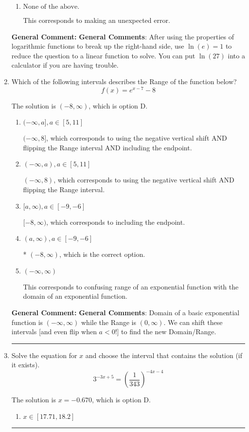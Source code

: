 \documentclass{extbook}[14pt]
\newcommand{\litem}[1]{\item #1

\rule{\textwidth}{0.4pt}}
\begin{document}
\begin{enumerate}
{\begin{enumerate}[label=\Alph*.]
This corresponds to believing you cannot solve the equation.
\item \( \text{None of the above.} \)

This corresponds to making an unexpected error.
\end{enumerate}

\textbf{General Comment:} \textbf{General Comments}: After using the properties of logarithmic functions to break up the right-hand side, use $\ln(e) = 1$ to reduce the question to a linear function to solve. You can put $\ln(27)$ into a calculator if you are having trouble.
}
\litem{
Which of the following intervals describes the Range of the function below?
\[ f(x) = e^{x-7}-8 \]

The solution is \( (-8, \infty) \), which is option D.\begin{enumerate}[label=\Alph*.]
\item \( (-\infty, a], a \in [5, 11] \)

$(-\infty, 8]$, which corresponds to using the negative vertical shift AND flipping the Range interval AND including the endpoint.
\item \( (-\infty, a), a \in [5, 11] \)

$(-\infty, 8)$, which corresponds to using the negative vertical shift AND flipping the Range interval.
\item \( [a, \infty), a \in [-9, -6] \)

$[-8, \infty)$, which corresponds to including the endpoint.
\item \( (a, \infty), a \in [-9, -6] \)

* $(-8, \infty)$, which is the correct option.
\item \( (-\infty, \infty) \)

This corresponds to confusing range of an exponential function with the domain of an exponential function.
\end{enumerate}

\textbf{General Comment:} \textbf{General Comments}: Domain of a basic exponential function is $(-\infty, \infty)$ while the Range is $(0, \infty)$. We can shift these intervals [and even flip when $a<0$!] to find the new Domain/Range.
}
\litem{
Solve the equation for $x$ and choose the interval that contains the solution (if it exists).
\[ 3^{-3x+5} = \left(\frac{1}{343}\right)^{-4x-4} \]

The solution is \( x = -0.670 \), which is option D.\begin{enumerate}[label=\Alph*.]
\item \( x \in [17.71, 18.2] \)


\end{enumerate}}
\end{enumerate}
\end{document}
